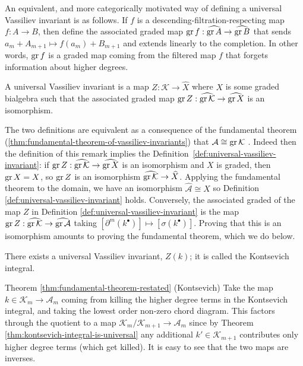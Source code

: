 \begin{remark}
	\label{rem:universal-vassiliev-invariant-universal-property-definition}
	An equivalent, and more categorically motivated way of defining a universal Vassiliev invariant is as follows. If \(f\) is a descending-filtration-respecting map \(f: A \to B\), then define the associated graded map \(\operatorname{gr} f: \widehat{\operatorname{gr} A} \to \widehat{\operatorname{gr} B}\) that sends \(a_{m} + A_{m + 1} \mapsto f(a_{m}) + B_{m + 1}\) and extends linearly to the completion. In other words, \(\operatorname{gr} f\) is a graded map coming from the filtered map \(f\) that forgets information about higher degrees.

	A universal Vassiliev invariant is a map \(Z: \mathcal{K} \to \widehat{X}\) where \(X\) is some graded bialgebra such that the associated graded map \(\operatorname{gr} Z: \widehat{\operatorname{gr} \mathcal{K}} \to \widehat{\operatorname{gr} X}\) is an isomorphism.

	The two definitions are equivalent as a consequence of the fundamental theorem (\ref{thm:fundamental-theorem-of-vassiliev-invariants}) that \(\mathcal{A} \cong \operatorname{gr} \mathcal{K}\) . Indeed then the definition of this remark implies the Definition~\ref{def:universal-vassiliev-invariant}: if \(\operatorname{gr} Z: \widehat{\operatorname{gr} \mathcal{K}} \to \widehat{\operatorname{gr} X}\) is an isomorphism and \(X\) is graded, then \(\operatorname{gr} X = X\), so \(\operatorname{gr} Z\) is an isomorphism \(\widehat{ \operatorname{gr} \mathcal{K}} \to \widehat{X}\). Applying the fundamental theorem to the domain, we have an isomorphism \(\widehat{\mathcal{A}} \cong \widehat{X}\) so Definition \ref{def:universal-vassiliev-invariant} holds. Conversely, the associated graded of the map \(Z\) in Definition \ref{def:universal-vassiliev-invariant} is the map \(\operatorname{gr} Z: \widehat{\operatorname{gr} \mathcal{K}} \to \widehat{\operatorname{gr} \mathcal{A}}\) taking \([\partial^{m}(k^{\bullet})] \mapsto [\sigma(k^{\bullet})]\). Proving that this is an isomorphism amounts to proving the fundamental theorem, which we do below.
\end{remark}

\begin{theorem}
	\label{thm:kontsevich-integral-is-universal}
	There exists a universal Vassiliev invariant, \(Z(k)\); it is called the Kontsevich integral.
\end{theorem}

\begin{proofof}{Theorem \ref{thm:fundamental-theorem-restated} (Kontsevich)}
	Take the map \(k \in \mathcal{K}_{m} \to \mathcal{A}_{m}\) coming from killing the higher degree terms in the Kontsevich integral, and taking the lowest order non-zero chord diagram. This factors through the quotient to a map \(\mathcal{K}_{m}/\mathcal{K}_{m + 1} \to \mathcal{A}_{m}\) since by Theorem \ref{thm:kontsevich-integral-is-universal} any additional \(k' \in \mathcal{K}_{m + 1}\) contributes only higher degree terms (which get killed). It is easy to see that the two maps are inverses.
\end{proofof}

